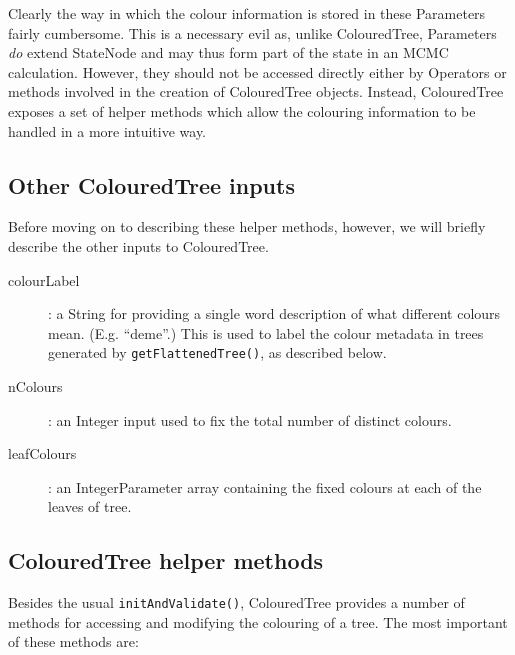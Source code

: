 \documentclass[a4paper,11pt]{paper}
\newcommand{\class}[1]{\textsf{#1}}
\newcommand{\inp}[1]{\textsf{\color{blue}#1}}
\newcommand{\code}[1]{\texttt{#1}}
\begin{document}
Clearly the way in which the colour information is stored in these
\class{Parameters} fairly cumbersome. This is a necessary evil
as, unlike \class{ColouredTree}, \class{Parameter}s \emph{do} extend
\class{StateNode} and may thus form part of the state in an MCMC
calculation. However, they should not be accessed directly either by
\class{Operator}s or methods involved in the creation of
\class{ColouredTree} objects. Instead, \class{ColouredTree} exposes a
set of helper methods which allow the colouring information to be
handled in a more intuitive way.

\subsection{Other ColouredTree inputs}

Before moving on to describing these helper methods, however, we will
briefly describe the other inputs to \class{ColouredTree}.

\begin{description}

	\item[\inp{colourLabel}]: a \class{String} for providing a
		single word description of what different colours mean. (E.g.
		``deme''.) This is used to label the colour metadata in trees
		generated by \code{getFlattenedTree()}, as described below.

	\item[\inp{nColours}]: an \class{Integer} input used to fix the
		total number of distinct colours.

	\item[\inp{leafColours}]: an \class{IntegerParameter} array
		containing the fixed colours at each of the leaves of
		\inp{tree}.

\end{description}

\subsection{ColouredTree helper methods}

Besides the usual \code{initAndValidate()}, \class{ColouredTree}
provides a number of methods for accessing and modifying the colouring
of a tree. The most important of these methods are:
\end{document}
